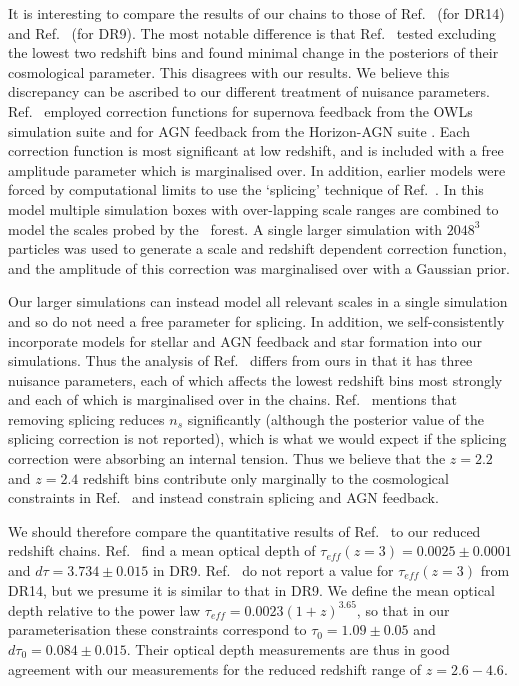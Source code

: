 It is interesting to compare the results of our chains to those of Ref.~\cite{2020JCAP...04..038P} (for DR14) and Ref.~\cite{2015JCAP...11..011P} (for DR9). The most notable difference is that Ref.~\cite{2020JCAP...04..038P} tested excluding the lowest two redshift bins and found minimal change in the posteriors of their cosmological parameter. This disagrees with our results. We believe this discrepancy can be ascribed to our different treatment of nuisance parameters. Ref.~\cite{2020JCAP...04..038P} employed correction functions for supernova feedback from the OWLs simulation suite \cite{2013MNRAS.429.1734V} and for AGN feedback from the Horizon-AGN suite \cite{2020MNRAS.495.1825C}. Each correction function is most significant at low redshift, and is included with a free amplitude parameter which is marginalised over. In addition, earlier models were forced by computational limits to use the `splicing' technique of Ref.~\cite{2014JCAP...07..005B}. In this model multiple simulation boxes with over-lapping scale ranges are combined to model the scales probed by the \Lya~forest. A single larger simulation with $2048^3$ particles was used to generate a scale and redshift dependent correction function, and the amplitude of this correction was marginalised over with a Gaussian prior.

Our larger simulations can instead model all relevant scales in a single simulation and so do not need a free parameter for splicing. In addition, we self-consistently incorporate models for stellar and AGN feedback and star formation into our simulations. Thus the analysis of Ref.~\cite{2020JCAP...04..038P} differs from ours in that it has three nuisance parameters, each of which affects the lowest redshift bins most strongly and each of which is marginalised over in the chains. Ref.~\cite{2015JCAP...02..045P} mentions that removing splicing reduces $n_s$ significantly (although the posterior value of the splicing correction is not reported), which is what we would expect if the splicing correction were absorbing an internal tension. 
Thus we believe that the $z=2.2$ and $z=2.4$ redshift bins contribute only marginally to the cosmological constraints in Ref.~\cite{2020JCAP...04..038P} and instead constrain splicing and AGN feedback. 

We should therefore compare the quantitative results of Ref.~\cite{2020JCAP...04..038P} to our reduced redshift chains. 
Ref.~\cite{2015JCAP...11..011P} find a mean optical depth of $\tau_{eff} (z=3) = 0.0025 \pm 0.0001$ and $d\tau = 3.734 \pm 0.015$ in DR9. Ref.~\cite{2020JCAP...04..038P} do not report a value for $\tau_{eff}(z=3)$ from DR14, but we presume it is similar to that in DR9. We define the mean optical depth relative to the power law $\tau_{eff} = 0.0023 (1+z)^{3.65}$, so that in our parameterisation these constraints correspond to $\tau_0 = 1.09 \pm 0.05$ and $d\tau_0 = 0.084\pm 0.015$. Their optical depth measurements are thus in good agreement with our measurements for the reduced redshift range of $z=2.6 - 4.6$. 

